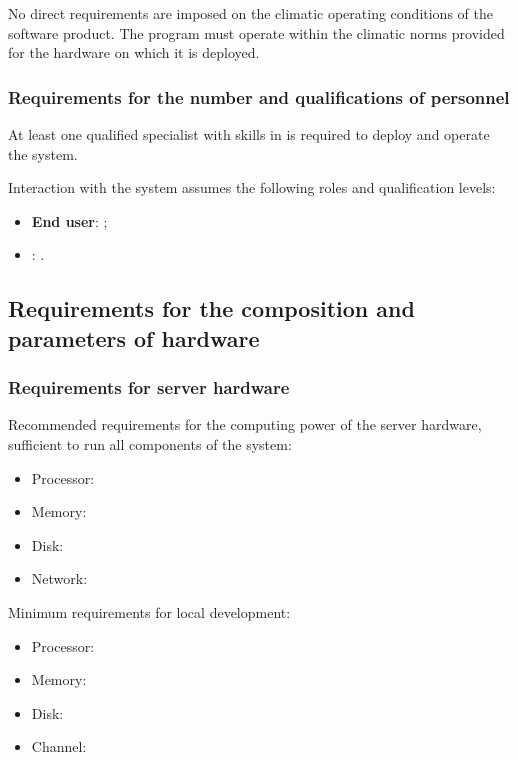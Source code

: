 \documentclass[12pt,a4paper]{extarticle}
\begin{document}
No direct requirements are imposed on the climatic operating conditions of the software product. The program must operate within the climatic norms provided for the hardware on which it is deployed.

\subsubsection{Requirements for the number and qualifications of personnel}

At least one qualified specialist with skills in  is required to deploy and operate the system.

Interaction with the system assumes the following roles and qualification levels:
\begin{itemize}[nosep, leftmargin=1.25cm]
    \item \textbf{End user}: ;
    \item \textbf{}: .
\end{itemize}

\subsection{Requirements for the composition and parameters of hardware}

\subsubsection{Requirements for server hardware}
\label{sec:server_hardware}

Recommended requirements for the computing power of the server hardware, sufficient to run all components of the system:

\begin{itemize}[leftmargin=1.25cm]
\item Processor: 
\item Memory: 
\item Disk: 
\item Network: 
\end{itemize}

Minimum requirements for local development:

\begin{itemize}[leftmargin=1.25cm]
\item Processor: 
\item Memory: 
\item Disk: 
\item Channel: 
\end{itemize}
\end{document}
